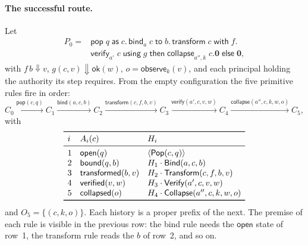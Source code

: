 \documentclass[11pt,openany]{book}
\theoremstyle{remark}
\newcommand{\Pop}{\mathsf{Pop}}
\newcommand{\Bind}{\mathsf{Bind}}
\newcommand{\Transform}{\mathsf{Transform}}
\newcommand{\Verify}{\mathsf{Verify}}
\newcommand{\Collapse}{\mathsf{Collapse}}
\begin{document}
\paragraph{The successful route.}
Let
\[
\begin{aligned}
P_0={}&\mathsf{pop}\;q\;\mathsf{as}\;c.\,
\mathsf{bind}_a\;c\;\mathsf{to}\;b.\,
\mathsf{transform}\;c\;\mathsf{with}\;f.\\
&\mathsf{verify}_{a'}\;c\;\mathsf{using}\;g\;\mathsf{then}\;
\mathsf{collapse}_{a'',k}\;c.\mathbf 0\;
\mathsf{else}\;\mathbf 0,
\end{aligned}
\]
with $f\,b\Downarrow v$, $g(c,v)\Downarrow\mathsf{ok}(w)$,
$o=\mathsf{observe}_k(v)$, and each principal holding the authority its
step requires. From the empty configuration the five primitive rules fire
in order:
\[
C_0\xrightarrow{\mathsf{pop}(c,q)}C_1
\xrightarrow{\mathsf{bind}(a,c,b)}C_2
\xrightarrow{\mathsf{transform}(c,f,b,v)}C_3
\xrightarrow{\mathsf{verify}(a',c,v,w)}C_4
\xrightarrow{\mathsf{collapse}(a'',c,k,w,o)}C_5,
\]
with
\[
\begin{array}{lll}
\toprule
i & A_i(c) & H_i\\
\midrule
1 & \mathsf{open}(q) & \langle\Pop(c,q)\rangle\\
2 & \mathsf{bound}(q,b) & H_1\cdot\Bind(a,c,b)\\
3 & \mathsf{transformed}(b,v) & H_2\cdot\Transform(c,f,b,v)\\
4 & \mathsf{verified}(v,w) & H_3\cdot\Verify(a',c,v,w)\\
5 & \mathsf{collapsed}(o) & H_4\cdot\Collapse(a'',c,k,w,o)\\
\bottomrule
\end{array}
\]
and $O_5=\{(c,k,o)\}$. Each history is a proper prefix of the next. The
premise of each rule is visible in the previous row: the bind rule needs
the $\mathsf{open}$ state of row~1, the transform rule reads the $b$ of
row~2, and so on.
\end{document}
